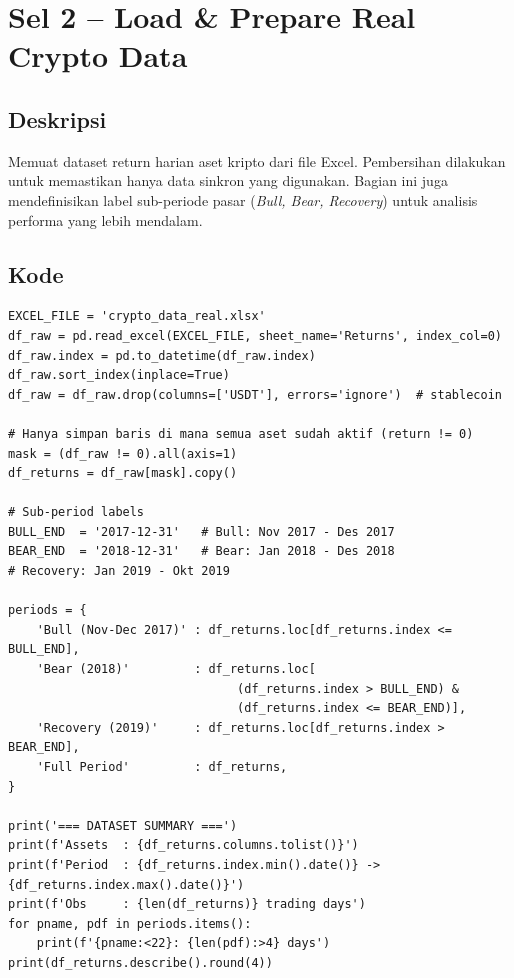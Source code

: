\documentclass[12pt,a4paper]{article}
\begin{document}
\section{Sel 2 -- Load \& Prepare Real Crypto Data}

\subsection{Deskripsi}
Memuat dataset return harian aset kripto dari file Excel. Pembersihan dilakukan untuk memastikan 
hanya data sinkron yang digunakan. Bagian ini juga mendefinisikan label sub-periode pasar 
(\textit{Bull, Bear, Recovery}) untuk analisis performa yang lebih mendalam.

\subsection{Kode}
\begin{lstlisting}[caption={Load dan preparasi data lengkap}]
EXCEL_FILE = 'crypto_data_real.xlsx'
df_raw = pd.read_excel(EXCEL_FILE, sheet_name='Returns', index_col=0)
df_raw.index = pd.to_datetime(df_raw.index)
df_raw.sort_index(inplace=True)
df_raw = df_raw.drop(columns=['USDT'], errors='ignore')  # stablecoin

# Hanya simpan baris di mana semua aset sudah aktif (return != 0)
mask = (df_raw != 0).all(axis=1)
df_returns = df_raw[mask].copy()

# Sub-period labels
BULL_END  = '2017-12-31'   # Bull: Nov 2017 - Des 2017
BEAR_END  = '2018-12-31'   # Bear: Jan 2018 - Des 2018
# Recovery: Jan 2019 - Okt 2019

periods = {
    'Bull (Nov-Dec 2017)' : df_returns.loc[df_returns.index <= BULL_END],
    'Bear (2018)'         : df_returns.loc[
                                (df_returns.index > BULL_END) &
                                (df_returns.index <= BEAR_END)],
    'Recovery (2019)'     : df_returns.loc[df_returns.index > BEAR_END],
    'Full Period'         : df_returns,
}

print('=== DATASET SUMMARY ===')
print(f'Assets  : {df_returns.columns.tolist()}')
print(f'Period  : {df_returns.index.min().date()} -> {df_returns.index.max().date()}')
print(f'Obs     : {len(df_returns)} trading days')
for pname, pdf in periods.items():
    print(f'{pname:<22}: {len(pdf):>4} days')
print(df_returns.describe().round(4))
\end{lstlisting}
\end{document}
